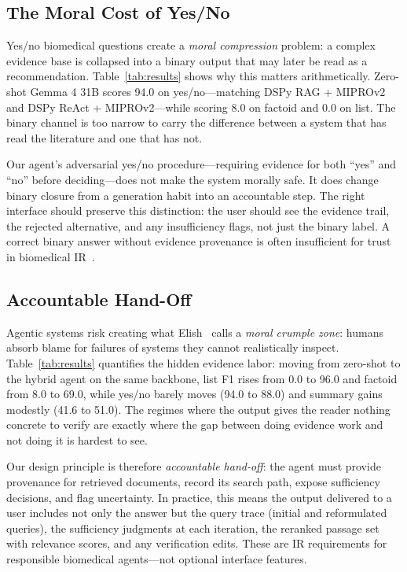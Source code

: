 \documentclass[sigconf,anonymous,review]{acmart}
\begin{document}
\subsection{The Moral Cost of Yes/No}

Yes/no biomedical questions create a \emph{moral compression} problem: a complex evidence base is collapsed into a binary output that may later be read as a recommendation.
Table~\ref{tab:results} shows why this matters arithmetically.
Zero-shot Gemma 4 31B scores 94.0 on yes/no---matching DSPy RAG + MIPROv2 and DSPy ReAct + MIPROv2---while scoring 8.0 on factoid and 0.0 on list.
The binary channel is too narrow to carry the difference between a system that has read the literature and one that has not.

Our agent's adversarial yes/no procedure---requiring evidence for both ``yes'' and ``no'' before deciding---does not make the system morally safe.
It does change binary closure from a generation habit into an accountable step.
The right interface should preserve this distinction: the user should see the evidence trail, the rejected alternative, and any insufficiency flags, not just the binary label.
A correct binary answer without evidence provenance is often insufficient for trust in biomedical IR~\cite{abdelwanis2024automation,khera2023automation}.

\subsection{Accountable Hand-Off}

Agentic systems risk creating what Elish~\cite{elish2019moral} calls a \emph{moral crumple zone}: humans absorb blame for failures of systems they cannot realistically inspect.
Table~\ref{tab:results} quantifies the hidden evidence labor: moving from zero-shot to the hybrid agent on the same backbone, list F1 rises from 0.0 to 96.0 and factoid from 8.0 to 69.0, while yes/no barely moves (94.0 to 88.0) and summary gains modestly (41.6 to 51.0).
The regimes where the output gives the reader nothing concrete to verify are exactly where the gap between doing evidence work and not doing it is hardest to see.

Our design principle is therefore \emph{accountable hand-off}: the agent must provide provenance for retrieved documents, record its search path, expose sufficiency decisions, and flag uncertainty.
In practice, this means the output delivered to a user includes not only the answer but the query trace (initial and reformulated queries), the sufficiency judgments at each iteration, the reranked passage set with relevance scores, and any verification edits.
These are IR requirements for responsible biomedical agents---not optional interface features.
\end{document}
